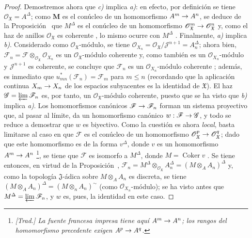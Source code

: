\documentclass[oneside]{amsart}
\theoremstyle{ega-env-style}
\theoremstyle{ega-thm-env-style}
\theoremstyle{ega-defn-env-style}
\def\leq{\leqslant}                 %
\renewcommand{\to}{\mathchoice{\longrightarrow}{\rightarrow}{\rightarrow}{\rightarrow}}
\newcommand{\oldpage}[2][]{{\marginnote{\normalfont{\textbf{#1}~|~#2}}}\ignorespaces}
\begin{document}
\begin{proof}
Demostremos ahora que \emph{c)} implica \emph{a)}: en efecto, por definición se tiene $\mathscr{O}_{\mathfrak{X}}=A^\Delta$; como $\mathbf{M}$ es el conúcleo de un homomorfismo $A^m\to A^n$, se deduce de la Proposición~ que $M^\Delta$ es el conúcleo de un homomorfismo $\mathscr{O}_{\mathfrak{X}}^m\to\mathscr{O}_{\mathfrak{X}}^n$ y, como el haz de anillos $\mathscr{O}_{\mathfrak{X}}$ es coherente , lo mismo ocurre con $M^\Delta$ .
\oldpage[I]{203}
Finalmente, \emph{a)} implica \emph{b)}.
Considerado como $\mathscr{O}_{\mathfrak{X}}$-módulo, se tiene $\mathscr{O}_{X_n}=\mathscr{O}_{\mathfrak{X}}/
\mathscr{J}^{n+1}=A_n^\Delta$; ahora bien, $\mathscr{F}_n=\mathscr{F}
\otimes_{\mathscr{O}_{\mathfrak{X}}}\mathscr{O}_{X_n}$ es un $\mathscr{O}_{\mathfrak{X}}$-módulo coherente  y, como también es un $\mathscr{O}_{X_n}$-módulo y $\mathscr{J}^{n+1}$ es coherente, se concluye que $\mathscr{F}_n$ es un $\mathscr{O}_{X_n}$-módulo coherente ; además, es inmediato que $u_{mn}^*(\mathscr{F}_n)=\mathscr{F}_m$ para $m\leq n$ (recordando que la aplicación continua $X_m\to X_n$ de los espacios subyacentes es la identidad de $\mathfrak{X}$).
El haz $\mathscr{G}=\varprojlim\mathscr{F}_n$ es, por tanto, un $\mathscr{O}_{\mathfrak{X}}$-módulo coherente, puesto que se ha visto que \emph{b)} implica \emph{a)}. Los homomorfismos canónicos $\mathscr{F}\to\mathscr{F}_n$ forman un sistema proyectivo que, al pasar al límite, da un homomorfismo canónico $w:\mathscr{F}\to\mathscr{G}$, y todo se reduce a demostrar que $w$ es biyectivo.
Como la cuestión es ahora \emph{local}, basta limitarse al caso en que $\mathscr{F}$ es el conúcleo de un homomorfismo $\mathscr{O}_{\mathfrak{X}}^p\to\mathscr{O}_{\mathfrak{X}}^q$; dado que este homomorfismo es de la forma $v^\Delta$, donde $v$ es un homomorfismo $A^m\to A^n$ \footnote{\emph{[Trad.] La fuente francesa impresa tiene aquí $A^m\to A^n$; los rangos del homomorfismo precedente exigen $A^p\to A^q$.}}, se tiene que $\mathscr{F}$ es isomorfo a $M^\Delta$, donde $M=\operatorname{Coker}v$ .
Se tiene entonces, en virtud de la Proposición~, $\mathscr{F}_n=M^\Delta\otimes_{\mathscr{O}_{\mathfrak{X}}}A_n^\Delta
=(M\otimes_A A_n)^\Delta$ y, como la topología $\mathfrak{J}$-ádica sobre $M\otimes_A A_n$ es discreta, se tiene $(M\otimes_A A_n)^\Delta=(M\otimes_n A_n)^{\sim}$ (como $\mathscr{O}_{X_n}$-módulo); se ha visto antes que $M^\Delta=\varprojlim\mathscr{F}_n$, y $w$ es, pues, la identidad en este caso.
\end{proof}
\end{document}
